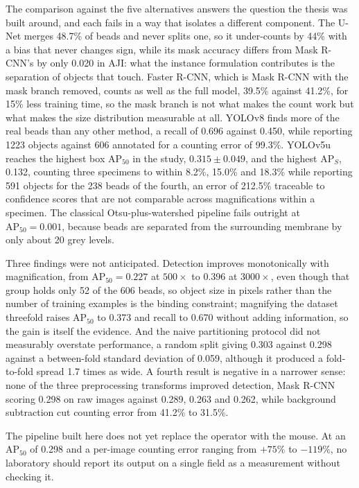 The comparison against the five alternatives answers the question the thesis was
built around, and each fails in a way that isolates a different component. The
U-Net merges 48.7\% of beads and never splits one, so it under-counts by 44\% with
a bias that never changes sign, while its mask accuracy differs from Mask R-CNN's
by only 0.020 in AJI: what the instance formulation contributes is the separation
of objects that touch. Faster R-CNN, which is Mask R-CNN with the mask branch
removed, counts as well as the full model, 39.5\% against 41.2\%, for 15\% less
training time, so the mask branch is not what makes the count work but what makes
the size distribution measurable at all. YOLOv8 finds more of the real beads than
any other method, a recall of 0.696 against 0.450, while reporting 1223 objects
against 606 annotated for a counting error of 99.3\%. YOLOv5u reaches the highest
box $\mathrm{AP}_{50}$ in the study, $0.315 \pm 0.049$, and the highest
$\mathrm{AP}_S$, 0.132, counting three specimens to within 8.2\%, 15.0\% and
18.3\% while reporting 591 objects for the 238 beads of the fourth, an error of
212.5\% traceable to confidence scores that are not comparable across
magnifications within a specimen. The classical Otsu-plus-watershed pipeline fails
outright at $\mathrm{AP}_{50} = 0.001$, because beads are separated from the
surrounding membrane by only about 20 grey levels.

Three findings were not anticipated. Detection improves monotonically with
magnification, from $\mathrm{AP}_{50} = 0.227$ at $500\times$ to 0.396 at
$3000\times$, even though that group holds only 52 of the 606 beads, so object
size in pixels rather than the number of training examples is the binding
constraint; magnifying the dataset threefold raises $\mathrm{AP}_{50}$ to 0.373
and recall to 0.670 without adding information, so the gain is itself the
evidence. And the naive partitioning protocol did not measurably overstate
performance, a random split giving 0.303 against 0.298 against a between-fold
standard deviation of 0.059, although it produced a fold-to-fold spread 1.7 times
as wide. A fourth result is negative in a narrower sense: none of the three
preprocessing transforms improved detection, Mask R-CNN scoring 0.298 on raw
images against 0.289, 0.263 and 0.262, while background subtraction cut
counting error from 41.2\% to 31.5\%.

The pipeline built here does not yet replace the operator with the mouse. At an
$\mathrm{AP}_{50}$ of 0.298 and a per-image counting error ranging from
$+75\%$ to $-119\%$, no laboratory should report its output on a single field as a
measurement without checking it.

